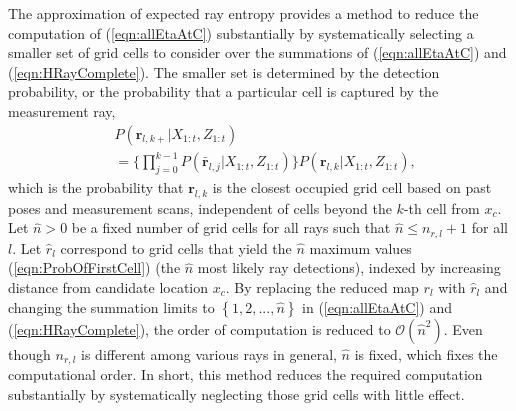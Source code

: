 \documentclass[letterpaper, 10pt, conference]{ieeeconf}
\newcommand{\braces}[1]{\ensuremath{\left\{ #1 \right\}}}
\newcommand{\refeqn}[1]{(\ref{eqn:#1})}
\begin{document}
The approximation of expected ray entropy provides a method to reduce the computation of \refeqn{allEtaAtC} substantially by systematically selecting a smaller set of grid cells to consider over the summations of \refeqn{allEtaAtC} and \refeqn{HRayComplete}.
The smaller set is determined by the detection probability, or the probability that a particular cell is captured by the measurement ray, %
%
%
%
\begin{align}
\label{eqn:ProbOfFirstCell}
&P(\mathbf{r}_{l,k+}|X_{1:t},Z_{1:t})\nonumber\\&=\bigg\{\prod_{j=0}^{k-1}P(\bar{\mathbf{r}}_{l,j}|X_{1:t},Z_{1:t})\bigg\}P(\mathbf{r}_{l,k}|X_{1:t},Z_{1:t}),
\end{align}
which is the probability that $\mathbf{r}_{l,k}$ is the closest occupied grid cell based on past poses and measurement scans, independent of cells beyond the $k$-th cell from $x_c$.
Let $\hat n>0$ be a fixed number of grid cells for all rays such that $\hat n\leq n_{r,l}+1$ for all $l$.
Let $\hat{r}_{l}$ correspond to grid cells that yield the $\hat{n}$ maximum values \refeqn{ProbOfFirstCell} (the $\hat n$ most likely ray detections), indexed by increasing distance from candidate location $x_c$.
By replacing the reduced map $r_l$ with $\hat{r}_l$ and changing the summation limits to $\braces{1,2,...,\hat n}$ in \refeqn{allEtaAtC} and \refeqn{HRayComplete}, the order of computation is reduced to $\mathcal O({\hat{n}}^2)$.
Even though $n_{r,l}$ is different among various rays in general, $\hat n$ is fixed, which fixes the computational order.
In short, this method reduces the required computation substantially by systematically neglecting those grid cells with little effect.
%
%
\end{document}
